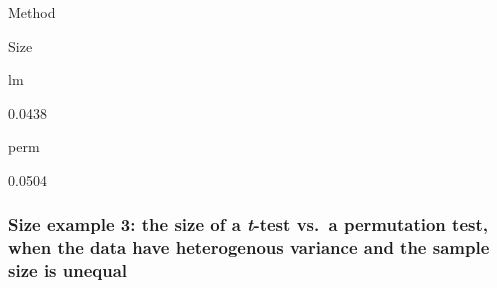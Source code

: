 \documentclass[]{book}
\begin{document}
Method

Size

lm

0.0438

perm

0.0504

\hypertarget{size-example-3-the-size-of-a-t-test-vs.-a-permutation-test-when-the-data-have-heterogenous-variance-and-the-sample-size-is-unequal}{%
\subsubsection{\texorpdfstring{Size example 3: the size of a \emph{t}-test vs.~a permutation test, when the data have heterogenous variance and the sample size is unequal}{Size example 3: the size of a t-test vs.~a permutation test, when the data have heterogenous variance and the sample size is unequal}}\label{size-example-3-the-size-of-a-t-test-vs.-a-permutation-test-when-the-data-have-heterogenous-variance-and-the-sample-size-is-unequal}}
\end{document}
